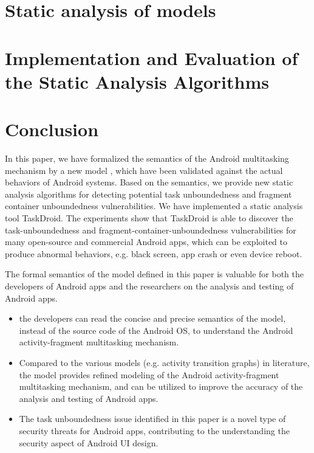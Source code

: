 \documentclass[acmsmall,manuscript,screen,review]{acmart}
\begin{document}
\section{Static analysis of {\AMASS} models} \label{sec:static}


\section{Implementation and Evaluation of the Static Analysis Algorithms}  \label{sec:eva}



\section{Conclusion} \label{sec:conc}
In this paper, we have formalized the semantics of the Android multitasking mechanism by a new model {\AMASS}, which have been validated against the actual behaviors of Android systems. Based on the semantics, we provide new static analysis algorithms for detecting potential task unboundedness and fragment container unboundedness vulnerabilities. We have implemented a static analysis tool TaskDroid. The experiments show that TaskDroid is able to discover the task-unboundedness and fragment-container-unboundedness vulnerabilities for many open-source and commercial Android apps, which can be exploited to produce abnormal behaviors, e.g. black screen, app crash or even device reboot. 

The formal semantics of the {\AMASS} model defined in this paper is valuable for both the developers of Android apps and the researchers on the analysis and testing of Android apps. 
\begin{itemize}
\item the developers can read the concise and precise semantics of the {\AMASS} model, instead of the source code of the Android OS, to understand the Android activity-fragment multitasking mechanism. %
%
\item Compared to the various models (e.g. activity transition graphs) in literature,  the {\AMASS} model provides refined modeling of the Android activity-fragment multitasking mechanism, and can be utilized to improve the accuracy of the analysis and testing of Android apps. 
%
\item The task unboundedness issue identified in this paper is a novel type of security threats for Android apps, contributing to %
the understanding the security aspect of Android UI design. 
\end{itemize}
\end{document}
